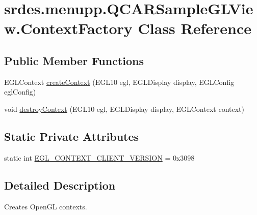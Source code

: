 \hypertarget{classsrdes_1_1menupp_1_1_q_c_a_r_sample_g_l_view_1_1_context_factory}{\section{srdes.\-menupp.\-Q\-C\-A\-R\-Sample\-G\-L\-View.\-Context\-Factory \-Class \-Reference}
\label{classsrdes_1_1menupp_1_1_q_c_a_r_sample_g_l_view_1_1_context_factory}
}
\subsection*{\-Public \-Member \-Functions}
\begin{DoxyCompactItemize}
\item 
\-E\-G\-L\-Context \hyperlink{classsrdes_1_1menupp_1_1_q_c_a_r_sample_g_l_view_1_1_context_factory_a11f26fa26576593ff635bad01c9cf6d8}{create\-Context} (\-E\-G\-L10 egl, \-E\-G\-L\-Display display, \-E\-G\-L\-Config egl\-Config)
\item 
void \hyperlink{classsrdes_1_1menupp_1_1_q_c_a_r_sample_g_l_view_1_1_context_factory_a9ce06d3c03ae54cb39eaad0c176540b8}{destroy\-Context} (\-E\-G\-L10 egl, \-E\-G\-L\-Display display, \-E\-G\-L\-Context context)
\end{DoxyCompactItemize}
\subsection*{\-Static \-Private \-Attributes}
\begin{DoxyCompactItemize}
\item 
static int \hyperlink{classsrdes_1_1menupp_1_1_q_c_a_r_sample_g_l_view_1_1_context_factory_aded0206e89ae94f3ff94c427dc19c67f}{\-E\-G\-L\-\_\-\-C\-O\-N\-T\-E\-X\-T\-\_\-\-C\-L\-I\-E\-N\-T\-\_\-\-V\-E\-R\-S\-I\-O\-N} = 0x3098
\end{DoxyCompactItemize}


\subsection{\-Detailed \-Description}
\-Creates \-Open\-G\-L contexts. 

